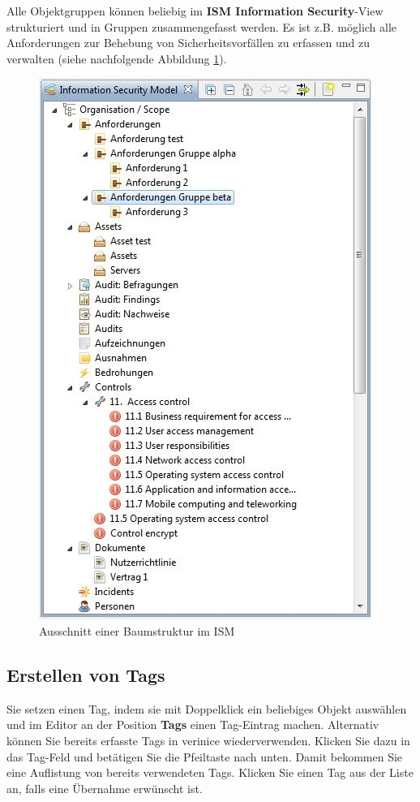 \documentclass[a4paper,10pt]{book}
\begin{document}
Alle Objektgruppen können beliebig im \textbf{ISM Information Security}-View strukturiert und in Gruppen zusammengefasst werden.
Es ist z.B. möglich alle Anforderungen zur Behebung von Sicherheitsvorfällen zu erfassen und zu verwalten (siehe nachfolgende Abbildung \ref{Ausschnitt einer Baumstruktur im ISM}).
\newline
\begin{figure}[htb!]
  \centering
  \includegraphics[scale=.7]{Screenshot/Baumstruktur_ISM.jpg}
  \caption{\label{Ausschnitt einer Baumstruktur im ISM} Ausschnitt einer Baumstruktur im ISM}
\end{figure}

\subsection{Erstellen von Tags}
Sie setzen einen Tag, indem sie mit Doppelklick ein beliebiges Objekt
auswählen und
im Editor an der Position \textbf{Tags} einen Tag-Eintrag machen.
Alternativ können Sie bereits erfasste Tags in verinice wiederverwenden.
Klicken Sie dazu in das Tag-Feld und betätigen Sie die Pfeiltaste nach unten.
Damit bekommen Sie eine Auflistung von bereits verwendeten Tags. Klicken
Sie einen Tag aus der Liste an, falls eine Übernahme erwünscht ist.
\end{document}
